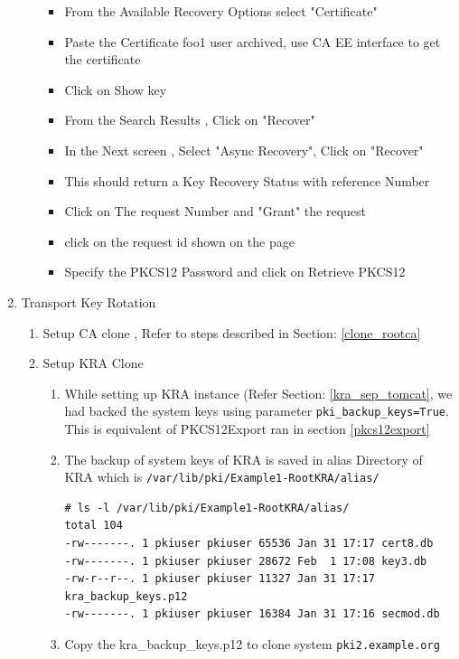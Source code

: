 \documentclass[a4paper]{article}
\begin{document}
\begin{enumerate}[label*=\arabic*.]
\begin{enumerate}[label*=\arabic*.]
\begin{itemize}
                        \item From the Available Recovery Options select "Certificate"
                        \item Paste the Certificate foo1 user archived, use CA EE interface to get the certificate
                        \item Click on Show key 
                        \item From the Search Results , Click on "Recover"
                        \item In the Next screen , Select "Async Recovery", Click on "Recover"
                        \item This should return a Key Recovery Status with reference Number
                        \item Click on The request Number and "Grant" the request
                        \item click on the request id shown on the page
                        \item Specify the PKCS12 Password and click on Retrieve PKCS12
                    \end{itemize}
            \end{enumerate}
        \item Transport Key Rotation
            \begin{enumerate}[label*=\arabic*.]
                \item Setup CA clone , Refer to steps described in Section: \ref{clone_rootca}
                \item Setup KRA Clone
                    \begin{enumerate}[label*=\arabic*.]
                        \item While setting up KRA instance (Refer Section: \ref{kra_sep_tomcat}, we had
                            backed the system keys using parameter \texttt{pki\_backup\_keys=True}. This 
                            is equivalent of PKCS12Export ran in section \ref{pkcs12export} 
                        \item The backup of system keys of KRA is saved in alias Directory of KRA which is
                            \texttt{/var/lib/pki/Example1-RootKRA/alias/}
                            \begin{lstlisting}[style=bashInputStyle]
# ls -l /var/lib/pki/Example1-RootKRA/alias/
total 104
-rw-------. 1 pkiuser pkiuser 65536 Jan 31 17:17 cert8.db
-rw-------. 1 pkiuser pkiuser 28672 Feb  1 17:08 key3.db
-rw-r--r--. 1 pkiuser pkiuser 11327 Jan 31 17:17 kra_backup_keys.p12
-rw-------. 1 pkiuser pkiuser 16384 Jan 31 17:16 secmod.db
                            \end{lstlisting}
                        \item Copy the kra\_backup\_keys.p12 to clone system \texttt{pki2.example.org}


\end{enumerate}
\end{enumerate}
\end{enumerate}
\end{document}
